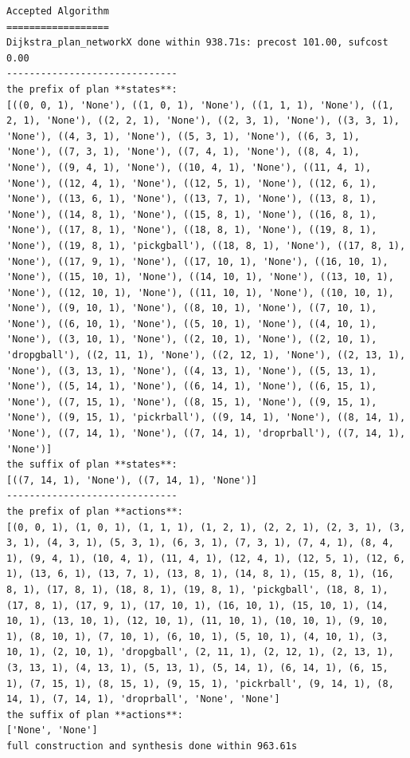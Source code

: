 \begin{lstlisting}
Accepted Algorithm
==================
Dijkstra_plan_networkX done within 938.71s: precost 101.00, sufcost 0.00
------------------------------
the prefix of plan **states**:
[((0, 0, 1), 'None'), ((1, 0, 1), 'None'), ((1, 1, 1), 'None'), ((1, 2, 1), 'None'), ((2, 2, 1), 'None'), ((2, 3, 1), 'None'), ((3, 3, 1), 'None'), ((4, 3, 1), 'None'), ((5, 3, 1), 'None'), ((6, 3, 1), 'None'), ((7, 3, 1), 'None'), ((7, 4, 1), 'None'), ((8, 4, 1), 'None'), ((9, 4, 1), 'None'), ((10, 4, 1), 'None'), ((11, 4, 1), 'None'), ((12, 4, 1), 'None'), ((12, 5, 1), 'None'), ((12, 6, 1), 'None'), ((13, 6, 1), 'None'), ((13, 7, 1), 'None'), ((13, 8, 1), 'None'), ((14, 8, 1), 'None'), ((15, 8, 1), 'None'), ((16, 8, 1), 'None'), ((17, 8, 1), 'None'), ((18, 8, 1), 'None'), ((19, 8, 1), 'None'), ((19, 8, 1), 'pickgball'), ((18, 8, 1), 'None'), ((17, 8, 1), 'None'), ((17, 9, 1), 'None'), ((17, 10, 1), 'None'), ((16, 10, 1), 'None'), ((15, 10, 1), 'None'), ((14, 10, 1), 'None'), ((13, 10, 1), 'None'), ((12, 10, 1), 'None'), ((11, 10, 1), 'None'), ((10, 10, 1), 'None'), ((9, 10, 1), 'None'), ((8, 10, 1), 'None'), ((7, 10, 1), 'None'), ((6, 10, 1), 'None'), ((5, 10, 1), 'None'), ((4, 10, 1), 'None'), ((3, 10, 1), 'None'), ((2, 10, 1), 'None'), ((2, 10, 1), 'dropgball'), ((2, 11, 1), 'None'), ((2, 12, 1), 'None'), ((2, 13, 1), 'None'), ((3, 13, 1), 'None'), ((4, 13, 1), 'None'), ((5, 13, 1), 'None'), ((5, 14, 1), 'None'), ((6, 14, 1), 'None'), ((6, 15, 1), 'None'), ((7, 15, 1), 'None'), ((8, 15, 1), 'None'), ((9, 15, 1), 'None'), ((9, 15, 1), 'pickrball'), ((9, 14, 1), 'None'), ((8, 14, 1), 'None'), ((7, 14, 1), 'None'), ((7, 14, 1), 'droprball'), ((7, 14, 1), 'None')]
the suffix of plan **states**:
[((7, 14, 1), 'None'), ((7, 14, 1), 'None')]
------------------------------
the prefix of plan **actions**:
[(0, 0, 1), (1, 0, 1), (1, 1, 1), (1, 2, 1), (2, 2, 1), (2, 3, 1), (3, 3, 1), (4, 3, 1), (5, 3, 1), (6, 3, 1), (7, 3, 1), (7, 4, 1), (8, 4, 1), (9, 4, 1), (10, 4, 1), (11, 4, 1), (12, 4, 1), (12, 5, 1), (12, 6, 1), (13, 6, 1), (13, 7, 1), (13, 8, 1), (14, 8, 1), (15, 8, 1), (16, 8, 1), (17, 8, 1), (18, 8, 1), (19, 8, 1), 'pickgball', (18, 8, 1), (17, 8, 1), (17, 9, 1), (17, 10, 1), (16, 10, 1), (15, 10, 1), (14, 10, 1), (13, 10, 1), (12, 10, 1), (11, 10, 1), (10, 10, 1), (9, 10, 1), (8, 10, 1), (7, 10, 1), (6, 10, 1), (5, 10, 1), (4, 10, 1), (3, 10, 1), (2, 10, 1), 'dropgball', (2, 11, 1), (2, 12, 1), (2, 13, 1), (3, 13, 1), (4, 13, 1), (5, 13, 1), (5, 14, 1), (6, 14, 1), (6, 15, 1), (7, 15, 1), (8, 15, 1), (9, 15, 1), 'pickrball', (9, 14, 1), (8, 14, 1), (7, 14, 1), 'droprball', 'None', 'None']
the suffix of plan **actions**:
['None', 'None']
full construction and synthesis done within 963.61s 
\end{lstlisting}
